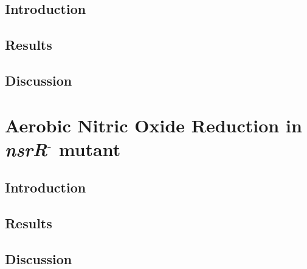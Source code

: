 \subsection{Introduction}
\subsection{Results}
\subsection{Discussion}
\section{Aerobic Nitric Oxide Reduction in \textit{nsrR$^\textrm{-}$} mutant}
\subsection{Introduction}
\subsection{Results}
\subsection{Discussion}